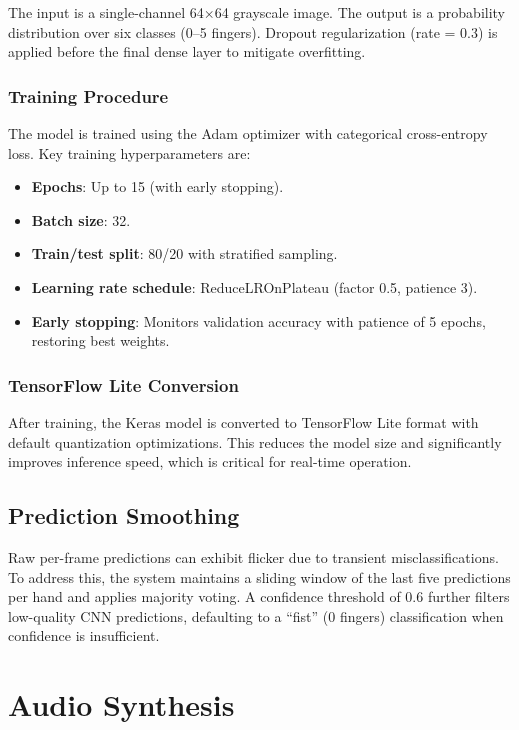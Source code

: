 \documentclass[conference]{IEEEtran}
\begin{document}
The input is a single-channel 64$\times$64 grayscale image. The output is a probability distribution over six classes (0--5 fingers). Dropout regularization (rate = 0.3) is applied before the final dense layer to mitigate overfitting.

\subsubsection{Training Procedure}

The model is trained using the Adam optimizer with categorical cross-entropy loss. Key training hyperparameters are:

\begin{itemize}
\item \textbf{Epochs}: Up to 15 (with early stopping).
\item \textbf{Batch size}: 32.
\item \textbf{Train/test split}: 80/20 with stratified sampling.
\item \textbf{Learning rate schedule}: ReduceLROnPlateau (factor 0.5, patience 3).
\item \textbf{Early stopping}: Monitors validation accuracy with patience of 5 epochs, restoring best weights.
\end{itemize}

\subsubsection{TensorFlow Lite Conversion}

After training, the Keras model is converted to TensorFlow Lite format with default quantization optimizations. This reduces the model size and significantly improves inference speed, which is critical for real-time operation.

\subsection{Prediction Smoothing}

Raw per-frame predictions can exhibit flicker due to transient misclassifications. To address this, the system maintains a sliding window of the last five predictions per hand and applies majority voting. A confidence threshold of 0.6 further filters low-quality CNN predictions, defaulting to a ``fist'' (0 fingers) classification when confidence is insufficient.

\section{Audio Synthesis}
\end{document}
